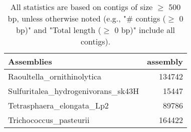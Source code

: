 \documentclass[12pt,a4paper]{article}
\begin{document}
\begin{table}[ht]
\begin{center}
\caption{All statistics are based on contigs of size $\geq$ 500 bp, unless otherwise noted (e.g., "\# contigs ($\geq$ 0 bp)" and "Total length ($\geq$ 0 bp)" include all contigs).}
\begin{tabular}{|l*{1}{|r}|}
\hline
Assemblies & assembly \\ \hline
Raoultella\_ornithinolytica & 134742 \\ \hline
Sulfuritalea\_hydrogenivorans\_sk43H & 15447 \\ \hline
Tetrasphaera\_elongata\_Lp2 & 89786 \\ \hline
Trichococcus\_pasteurii & 164422 \\ \hline
\end{tabular}
\end{center}
\end{table}
\end{document}
